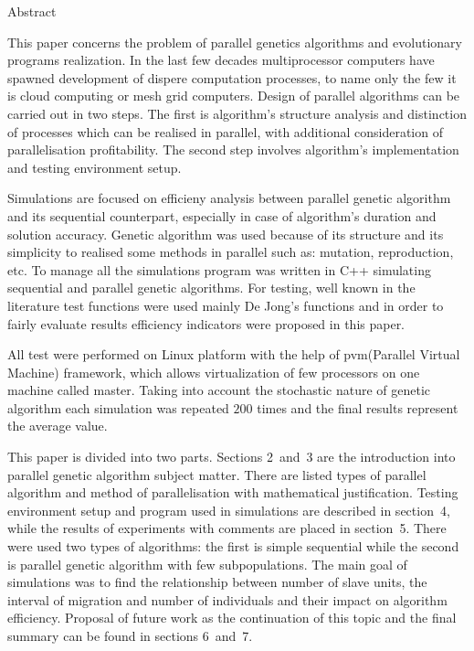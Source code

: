 \thispagestyle{empty}
\begin{center}
	Abstract
\end{center}

This paper concerns the problem of parallel genetics
algorithms and evolutionary programs realization. In the last few decades multiprocessor
computers have spawned development of dispere computation processes, to name
only the few it is cloud computing or mesh grid computers. Design of parallel
algorithms can be carried out in two steps. The first is algorithm's structure
analysis and distinction of processes which can be realised in parallel, with
additional consideration of parallelisation profitability. The second step involves algorithm's
implementation and testing environment setup.

Simulations are focused on efficieny analysis between
parallel genetic algorithm and its sequential counterpart, especially in case
of algorithm's duration and solution accuracy. Genetic algorithm was used
because of its structure and its simplicity to realised some methods in parallel
such as: mutation, reproduction, etc. To manage all the simulations program was
written in C++ simulating sequential and parallel genetic algorithms. For
testing, well known in the literature test functions were used mainly De Jong's
functions and in order to fairly evaluate results efficiency indicators were
proposed in this paper. 

All test were performed on Linux platform with the help of pvm(Parallel Virtual
Machine) framework, which allows virtualization of few processors on one machine
called master. Taking into account the stochastic nature of genetic algorithm
each simulation was repeated $200$ times and the final results represent the
average value. 

This paper is divided into two parts. Sections 2~and~3 are the introduction into
parallel genetic algorithm subject matter. There are listed types of parallel algorithm
and method of parallelisation with mathematical justification. Testing
environment setup and program used in simulations are described in section~4,
while the results of experiments with comments are placed in section~5. 
There were used two types of algorithms: the first is simple sequential while 
the second is parallel genetic algorithm with few subpopulations. The main 
goal of simulations was to find the relationship between number of slave units, 
the interval of migration and number of individuals and their impact on algorithm
efficiency. Proposal of future work as the continuation of this topic and the
final summary can be found in sections 6~and~7.

